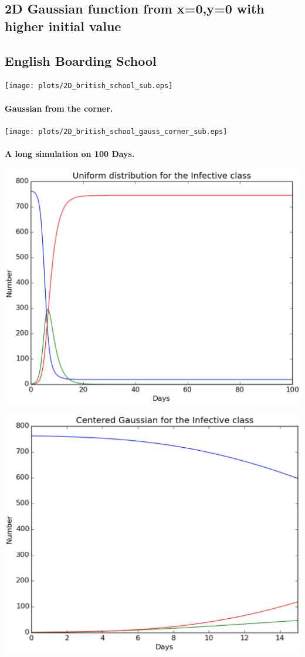 \documentclass[%
twoside,                 %
final,                   %
10pt]{article}
\begin{document}
\subsection{2D Gaussian function from x=0,y=0 with higher initial value}

\subsection{English Boarding School}



\centerline{\texttt{[image: plots/2D\_british\_school\_sub.eps]}}



\paragraph{Gaussian from the corner.}
\centerline{\texttt{[image: plots/2D\_british\_school\_gauss\_corner\_sub.eps]}}



\paragraph{A long simulation on 100 Days.}
\centerline{\includegraphics[width=0.8\linewidth]{plots/2D_british_school_long_number.eps}}





\centerline{\includegraphics[width=0.8\linewidth]{plots/2D_british_school_gauss_long_number.eps}}
\end{document}
